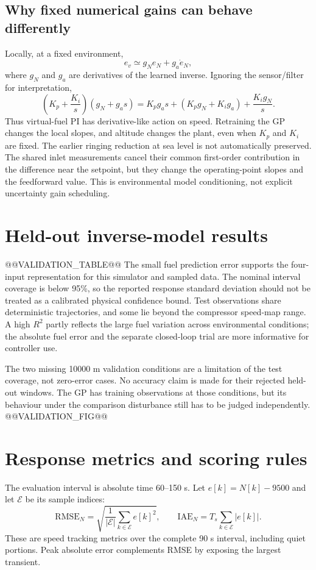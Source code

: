 \subsection{Why fixed numerical gains can behave differently}
Locally, at a fixed environment,
\begin{equation}
e_v\simeq g_N e_N+g_a\dot e_N,
\end{equation}
where $g_N$ and $g_a$ are derivatives of the learned inverse. Ignoring the sensor/filter for interpretation,
\begin{equation}
\left(K_p+\frac{K_i}{s}\right)(g_N+g_as)
=K_pg_as+(K_pg_N+K_ig_a)+\frac{K_ig_N}{s}.
\end{equation}
Thus virtual-fuel PI has derivative-like action on speed. Retraining the GP changes the local slopes, and altitude changes the plant, even when $K_p$ and $K_i$ are fixed. The earlier ringing reduction at sea level is not automatically preserved. The shared inlet measurements cancel their common first-order contribution in the difference near the setpoint, but they change the operating-point slopes and the feedforward value. This is environmental model conditioning, not explicit uncertainty gain scheduling.

\section{Held-out inverse-model results}
@@VALIDATION_TABLE@@
The small fuel prediction error supports the four-input representation for this simulator and sampled data. The nominal interval coverage is below 95\%, so the reported response standard deviation should not be treated as a calibrated physical confidence bound. Test observations share deterministic trajectories, and some lie beyond the compressor speed-map range. A high $R^2$ partly reflects the large fuel variation across environmental conditions; the absolute fuel error and the separate closed-loop trial are more informative for controller use.

The two missing 10000 m validation conditions are a limitation of the test coverage, not zero-error cases. No accuracy claim is made for their rejected held-out windows. The GP has training observations at those conditions, but its behaviour under the comparison disturbance still has to be judged independently.
@@VALIDATION_FIG@@

\clearpage
\section{Response metrics and scoring rules}
The evaluation interval is absolute time 60--150 s. Let $e[k]=N[k]-9500$ and let $\mathcal E$ be its sample indices:
\begin{equation}
\mathrm{RMSE}_N=\sqrt{\frac1{|\mathcal E|}\sum_{k\in\mathcal E}e[k]^2},\qquad
\mathrm{IAE}_N=T_s\sum_{k\in\mathcal E}|e[k]|.
\end{equation}
These are speed tracking metrics over the complete 90 s interval, including quiet portions. Peak absolute error complements RMSE by exposing the largest transient.

